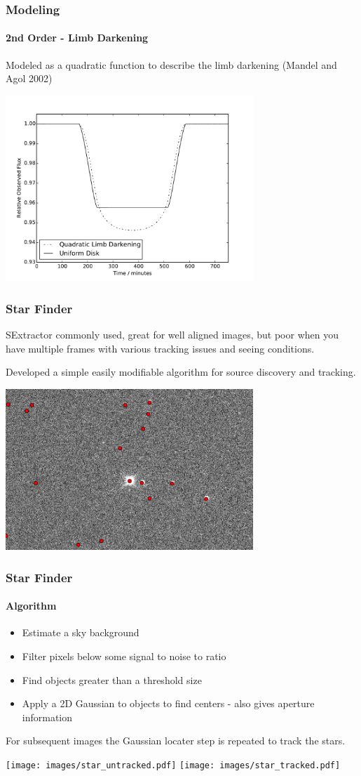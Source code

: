 \documentclass{beamer}
\begin{document}
  \begin{frame}
  \frametitle{Modeling}
    \framesubtitle{2nd Order - Limb Darkening}
    Modeled as a quadratic function to describe the limb darkening (Mandel and Agol 2002)
    \begin{center}
    \includegraphics[width=0.7\textwidth]{images/model_comparison.pdf}
    \end{center}
  \end{frame}
  \begin{frame}
  \frametitle{Star Finder}
  SExtractor commonly used, great for well aligned images, but poor when you have multiple frames with various tracking issues and seeing conditions.

  Developed a simple easily modifiable algorithm for source discovery and tracking.
  \begin{center}
    \includegraphics[width=0.7\textwidth]{images/starfinder_zoom.png}
  \end{center}
  \end{frame}
  \begin{frame}
  \frametitle{Star Finder}
    \framesubtitle{Algorithm}
    \begin{itemize}
        \item Estimate a sky background
        \item Filter pixels below some signal to noise to ratio
        \item Find objects greater than a threshold size
        \item Apply a 2D Gaussian to objects to find centers - also gives aperture information
    \end{itemize}
    For subsequent images the Gaussian locater step is repeated to track the stars.
    \begin{center}
        \texttt{[image: images/star\_untracked.pdf]}\quad
        \texttt{[image: images/star\_tracked.pdf]}
    \end{center}
  \end{frame}
\end{document}
